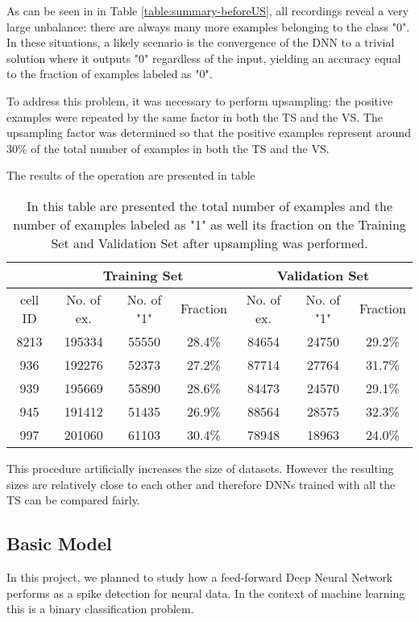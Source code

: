 As can be seen in in Table \ref{table:summary-beforeUS}, all recordings reveal a very large unbalance: there are always many more examples belonging to the class "0". In these situations, a likely scenario is the convergence of the DNN to a trivial solution where it outputs "0" regardless of the input, yielding an accuracy equal to the fraction of examples labeled as "0".

To address this problem, it was necessary to perform upsampling: the positive examples were repeated by the same factor in both the TS and the VS. The upsampling factor was determined so that the positive examples represent around 30\% of the total number of examples in both the TS and the VS.

The results of the operation are presented in table 

\begin{table}[htbp]
\begin{center}
\begin{tabular}{c|ccc|ccc}
\multicolumn{1}{l|}{} & \multicolumn{ 3}{c|}{Training Set} & \multicolumn{ 3}{c}{Validation Set} \\ \hline
cell ID & No. of ex. & No. of "1" & Fraction & No. of ex. & No. of "1" & Fraction  \\ \hline
8213 & 195334 & 55550 & 28.4\% & 84654 & 24750 & 29.2\% \\ 
936 & 192276 & 52373 & 27.2\% & 87714 & 27764 & 31.7\% \\ 
939 & 195669 & 55890 & 28.6\% & 84473 & 24570 & 29.1\% \\ 
945 & 191412 & 51435 & 26.9\% & 88564 & 28575 & 32.3\% \\ 
997 & 201060 & 61103 & 30.4\% & 78948 & 18963 & 24.0\% \\ 
\end{tabular}
\end{center}
\caption{In this table are presented the total number of examples and the number of examples labeled as "1" as well its fraction on the Training Set and Validation Set after upsampling was performed. }
\label{table:summary-afterUS}
\end{table}

This procedure artificially increases the size of datasets. However the resulting sizes are relatively close to each other and therefore DNNs trained with all the TS can be compared fairly.

\subsection{Basic Model}
In this project, we planned to study how a feed-forward Deep Neural Network performs as a spike detection for neural data. In the context of machine learning this is a binary classification problem.

